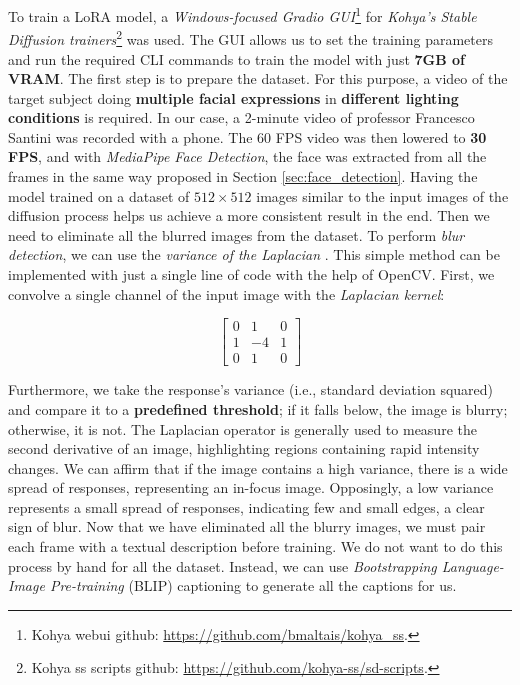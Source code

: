 \documentclass[preprint]{elsarticle}
\begin{document}
To train a LoRA model, a \emph{Windows-focused Gradio GUI}\footnote{Kohya webui github: \url{https://github.com/bmaltais/kohya_ss}.} for \emph{Kohya's Stable Diffusion trainers}\footnote{Kohya ss scripts github: \url{https://github.com/kohya-ss/sd-scripts}.} was used. 
The GUI allows us to set the training parameters and run the required 
CLI commands to train the model with just \textbf{7GB of VRAM}. 
The first step is to prepare the dataset. For this purpose, 
a video of the target subject doing \textbf{multiple facial expressions} in \textbf{different lighting conditions} 
is required. In our case, a 2-minute video of professor Francesco Santini was recorded with a phone. 
The 60 FPS video was then lowered to \textbf{30 FPS}, and with \emph{MediaPipe Face Detection},
the face was extracted from all the frames in the same way proposed in Section \ref{sec:face_detection}.
Having the model trained on a dataset of $512\times 512$ images similar to the input images 
of the diffusion process helps us achieve a more consistent result in the end. 
Then we need to eliminate all the blurred images from the dataset. 
To perform \emph{blur detection}, we can use the \emph{variance of the Laplacian} \cite{903548}. 
This simple method can be implemented with just a single line of code with the help of OpenCV. 
First, we convolve a single channel of the input image with the \emph{Laplacian kernel}:

\begin{equation}
	\begin{bmatrix}
		0 & 1 & 0\\
		1 & -4 & 1\\
		0 & 1 & 0
	\end{bmatrix}
\end{equation}

Furthermore, we take the response's variance (i.e., standard deviation squared) 
and compare it to a \textbf{predefined threshold}; if it falls below, the image is blurry; otherwise, it is not.
The Laplacian operator is generally used to measure the second derivative of an image, 
highlighting regions containing rapid intensity changes. 
We can affirm that if the image contains a high variance, there is a wide spread of responses, 
representing an in-focus image. Opposingly, a  low variance represents a small spread of responses, 
indicating few and small edges, a clear sign of blur.
Now that we have eliminated all the blurry images, 
we must pair each frame with a textual description before training. 
We do not want to do this process by hand for all the dataset. 
Instead, we can use \emph{Bootstrapping Language-Image Pre-training} (BLIP) captioning \cite{li2022blip} 
to generate all the captions for us. 
\end{document}
